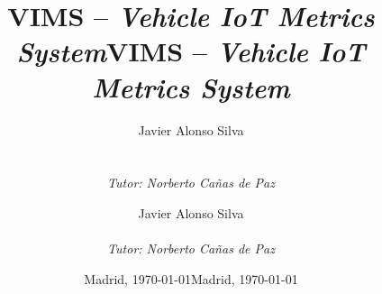 
\def\University{\textit{Universidad Politécnica de Madrid}\\ \textit{Escuela Técnica Superior de Ingeniería de Sistemas Informáticos}}
\def\Course{\textit{Máster en Software de Sistemas Distribuidos y Empotrados}}
\def\Module{\textit{Proyecto Fin de Máster}}
\def\Docent{\textit{Tutor: Norberto Cañas de Paz}}
\def\Assistant{}


\def\Subtitle{VIMS -- \textit{Vehicle IoT Metrics System}}
\def\Authors{Javier Alonso Silva}
\def\Shortname{J. Alonso}


\title{\Subtitle}
\author{\Authors \\ \\ \\ \Docent}
\date{Madrid, \today{}}


\title{\Subtitle}
\author{\Authors \\\\\Docent}
\date{Madrid, \today}

